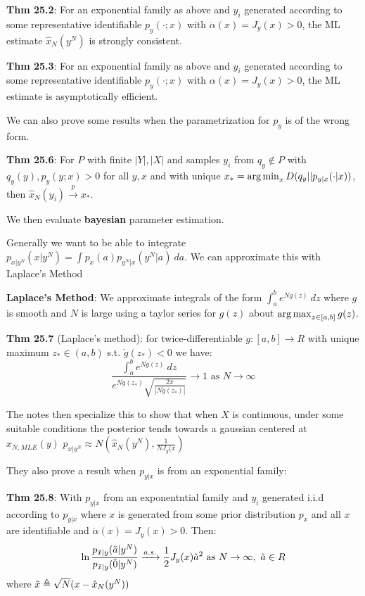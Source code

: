\documentclass[12pt]{article} %
\begin{document}
\textbf{Thm 25.2}: For an exponential family as above and $y_i$ generated according to some representative identifiable $p_y(\cdot;x)$ with $\ddot{\alpha}(x) = J_y(x) > 0$, the ML estimate $\hat{x}_N(y^N)$ is strongly consistent.

\textbf{Thm 25.3}: For an exponential family as above and $y_i$ generated according to some representative identifiable $p_y(\cdot;x)$ with $\alpha(x) = J_y(x) > 0$, the ML estimate is asymptotically efficient.


\separate

We can also prove some results when the parametrization for $p_y$ is of the wrong form.

\textbf{Thm 25.6}: For $P$ with finite $|Y|,|X|$ and samples $y_i$ from $q_y \notin P$ with $q_y(y), p_y(y;x) > 0$ for all $y,x$ and with unique $x_* = \operatorname*{arg\,min}_x D(q_y || p_{y|x}(\cdot|x))$, then $\hat{x}_N(y_i) \xrightarrow{p} x_*$.

\separate
We then evaluate \textbf{bayesian} parameter estimation.

Generally we want to be able to integrate $p_{x|y^N}(x|y^N) = \int p_x(a) p_{y^N|x}(y^N | a)\ da$. We can approximate this with Laplace's Method


\textbf{Laplace's Method}: We approximate integrals of the form $\int_a^b e^{Ng(z)} \ dz$ where $g$ is smooth and $N$ is large using a taylor series for $g(z)$ about $\operatorname*{arg\,max}_{z \in [a,b]} g(z)$.

\textbf{Thm 25.7} (Laplace's method): for twice-differentiable $g:[a,b] \rightarrow R$ with unique maximum $z_* \in (a,b)$ s.t. $\ddot{g}(z_*) < 0$ we have:
\begin{equation*}
    \frac{
    \int_a^b e^{Ng(z)}\ dz
    }{
    e^{Ng(z_*)} 
    \sqrt{\frac{2\pi}{|N\ddot{g}(z_*)|}}
    }
    \rightarrow 1
    \text{ as } N \rightarrow \infty
\end{equation*}

The notes then specialize this to show that when $X$ is continuous, under some suitable conditions the posterior tends towards a gaussian centered at $\hat{x}_{N, MLE}(y)$ $p_{x|y^N} \approx N(\hat{x}_N(y^N), \frac{1}{NJ_y(x})$

They also prove a result when $p_{y|x}$ is from an exponential family:

\textbf{Thm 25.8}: With $p_{y|x}$ from an exponentntial family and $y_i$ generated i.i.d according to $p_{y|x}$ where $x$ is generated from some prior distribution $p_x$ and all $x$ are identifiable and $\ddot{\alpha}(x) = J_y(x) > 0$. Then:
\begin{equation*}
    \ln
    \frac{p_{\Tilde{x}|y}(\Tilde{a}|y^N)}{
    p_{\Tilde{x}|y}(\Tilde{0}|y^N)
    }
    \xrightarrow{a.s.}
    \frac{1}{2}J_y(x)\Tilde{a}^2
    \text{ as }
    N \rightarrow \infty, \ \Tilde{a} \in R
\end{equation*}
where $\Tilde{x} \triangleq \sqrt{N}(x - \hat{x}_N(y^N))$
\end{document}
